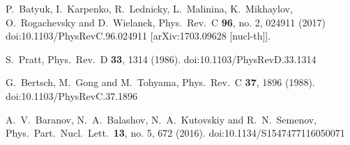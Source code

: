 \documentclass[a4paper]{panl}
\begin{document}
\begin{thebibliography}{1}
  P.~Batyuk, I.~Karpenko, R.~Lednicky, L.~Malinina, K.~Mikhaylov, O.~Rogachevsky and D.~Wielanek,
  Phys.\ Rev.\ C {\bf 96}, no. 2, 024911 (2017)
  doi:10.1103/PhysRevC.96.024911
  [arXiv:1703.09628 [nucl-th]].

  S.~Pratt,
  Phys.\ Rev.\ D {\bf 33}, 1314 (1986).
  doi:10.1103/PhysRevD.33.1314

  G.~Bertsch, M.~Gong and M.~Tohyama,
  Phys.\ Rev.\ C {\bf 37}, 1896 (1988).
  doi:10.1103/PhysRevC.37.1896
  

  A.~V.~Baranov, N.~A.~Balashov, N.~A.~Kutovskiy and R.~N.~Semenov,
  Phys.\ Part.\ Nucl.\ Lett.\  {\bf 13}, no. 5, 672 (2016).
  doi:10.1134/S1547477116050071
\end{thebibliography}
\end{document}
